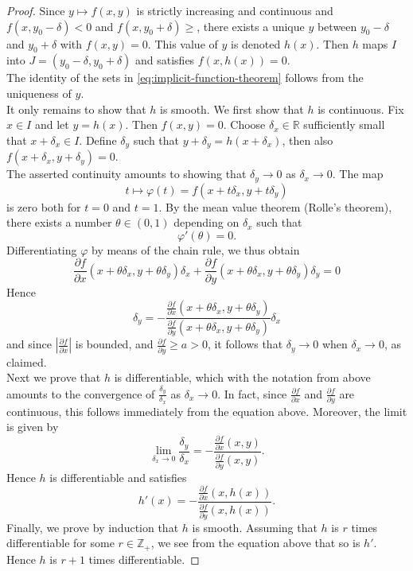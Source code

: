 \documentclass[reqno]{amsart}
\theoremstyle{plain}%
\theoremstyle{definition}
\theoremstyle{remark}
\begin{document}
\begin{proof}
    Since $y \mapsto f(x,y)$ is strictly increasing and continuous
    and $f\left( x, y_0- \delta \right) < 0$ and
    $f\left( x, y_0+ \delta \right) \ge $, there exists a unique $y$ between
    $y_0 - \delta$ and $y_0 + \delta$ with $f(x,y) = 0$. This value of
    $y$ is denoted $h(x)$. Then $h$ maps $I$ into $J
    = \left( y_0 - \delta, y_0 + \delta \right) $ and satisfies
    $f\left( x, h(x) \right) =0$.\\
    The identity of the sets in \eqref{eq:implicit-function-theorem}
    follows from the uniqueness of $y$.\\
    \linebreak
    It only remains to show that $h$ is smooth. We first show that
    $h$ is continuous. Fix $x \in I$ and let $y = h(x)$. Then
    $f(x,y)=0$. Choose $\delta_x \in \mathbb{R}$ sufficiently small that
    $x + \delta_x \in I$. Define
    $\delta_y$ such that $y+ \delta_y = h(x+ \delta_x)$, then also
    $f\left( x+\delta_x , y + \delta_y \right) =0$.\\
    The asserted continuity amounts to showing that $\delta_y \to 0$ as
    $\delta_x \to 0$. The map
    \[
    t \mapsto \varphi(t) = f\left( x+ t \delta_x, y + t \delta_y \right) 
    \] 
    is zero both for $t=0$ and $t=1$. By the mean value theorem (Rolle's
    theorem), there exists a number $\theta \in \left( 0,1 \right) $ depending
    on $\delta_x$ such that
    \[
    \varphi' \left( \theta \right) =0.
    \] 
    Differentiating $\varphi$ by means of the chain rule, we thus obtain
    \[
    \frac{\partial f}{\partial x} \left( x+ \theta \delta_x,
    y +  \theta \delta_y \right) \delta_x +
    \frac{\partial f}{\partial y}\left( x+ \theta \delta_x , 
    y+ \theta \delta_y \right) \delta_y = 0
    \] 
    Hence
    \[
    \delta_y = - \frac{\frac{\partial f}{\partial x}\left( x+ \theta \delta_x,
    y + \theta \delta_y \right) }{\frac{\partial f}{\partial y} 
    \left( x + \theta \delta_x , y + \theta \delta_y \right) } \delta_x
    \] 
    and since $\left| \frac{\partial f}{\partial x} \right| $ is bounded, and
    $\frac{\partial f}{\partial y} \ge a >0$, it follows that $\delta_y \to 0$ 
    when $\delta_x \to 0$, as claimed.\\
    Next we prove that $h$ is differentiable, which with the notation from
    above amounts to the convergence of 
    $\frac{\delta_y}{\delta_x}$ as $\delta_x \to 0$. In fact, since
    $\frac{\partial f}{\partial x}$ and $\frac{\partial f}{\partial y}$ are
    continuous, this follows immediately from the equation above.
    Moreover, the limit is given by
    \[
    \lim_{\delta_x \to 0} \frac{\delta_y}{\delta_x}
    = - \frac{\frac{\partial f}{\partial x}(x,y)}{
    \frac{\partial f}{\partial y}(x,y)}.
    \] 
    Hence $h$ is differentiable and satisfies
    \[
    h'(x) = - \frac{\frac{\partial f}{\partial x}(x,h(x))}{
    \frac{\partial f}{\partial y}(x,h(x))}.
    \] 
    Finally, we prove by induction that $h$ is smooth. Assuming that $h$ is $r$ 
    times differentiable for some $r \in \mathbb{Z}_+$, we see from the
    equation above that so is $h'$. Hence $h$ is $r+1$ times differentiable.
\end{proof}
\end{document}
